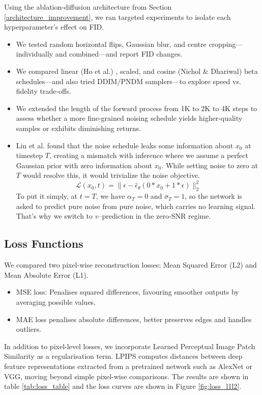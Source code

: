 \documentclass[conference]{IEEEtran}
\begin{document}
Using the ablation-diffusion architecture from Section \ref{architecture_improvement}, we ran targeted experiments to isolate each hyperparameter’s effect on FID.
\begin{itemize}
    \item We tested random horizontal flips, Gaussian blur, and centre cropping—individually and combined—and report FID changes.
    \item We compared linear (Ho et al.) \cite{hoDenoisingDiffusionProbabilistic2020}, scaled, and cosine (Nichol \& Dhariwal) \cite{nicholImprovedDenoisingDiffusion2021} beta schedules—and also tried DDIM/PNDM \cite{liuPseudoNumericalMethods2022} samplers—to explore speed vs. fidelity trade-offs.
    \item We extended the length of the forward process from 1K to 2K to 4K steps to assess whether a more fine‐grained noising schedule yields higher-quality samples or exhibits diminishing returns.
    \item Lin et al. \cite{linCommonDiffusionNoise2024} found that the noise schedule leaks some information about $x_0$ at timestep $T$, creating a mismatch with inference where we assume a perfect Gaussian prior with zero information about $x_0$. While setting noise to zero at $T$ would resolve this, it would trivialize the noise objective.
    $$
    \mathcal{L}(x_0, t) = \|\epsilon - \hat{\epsilon}_\theta(0 * x_0 + 1 * \epsilon)\|_2^2
    $$
    To put it simply, at $t=T$, we have $\alpha_T=0$ and $\sigma_T=1$, so the network is asked to predict pure noise from pure noise, which carries no learning signal. That’s why we switch to $v$–prediction \cite{salimansProgressiveDistillationFast2022} in the zero‐SNR regime.
\end{itemize}
\subsection{Loss Functions}\label{loss_functions}
We compared two pixel-wise reconstruction losses: Mean Squared Error (L2) and Mean Absolute Error (L1).
\begin{itemize}
    \item MSE loss: Penalises squared differences, favouring smoother outputs by averaging possible values.
    \item MAE loss penalises absolute differences, better preserves edges and handles outliers.
\end{itemize}
In addition to pixel-level losses, we incorporate Learned Perceptual Image Patch Similarity \cite{zhangUnreasonableEffectivenessDeep2018} as a regularisation term. LPIPS computes distances between deep feature representations extracted from a pretrained network such as AlexNet or VGG, moving beyond simple pixel-wise comparisons. The results are shown in table \ref{tab:loss_table} and the loss curves are shown in Figure \ref{fig:loss_l1l2}.
\end{document}
